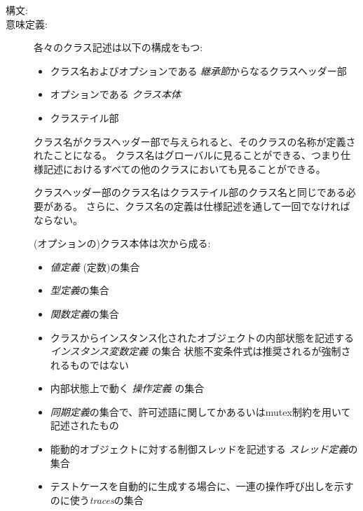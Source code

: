 \documentclass[\pformat,12pt]{jarticle}
\begin{document}
\begin{description}
\item[構文:] 

\item[意味定義:] 各々のクラス記述は以下の構成をもつ:
\begin{itemize}
\item クラス名およびオプションである {\em 継承節}からなるクラスヘッダー部
\item オプションである {\em クラス本体}
\item クラステイル部
\end{itemize}

クラス名がクラスヘッダー部で与えられると、そのクラスの名称が定義されたことになる。 
クラス名はグローバルに見ることができる、つまり仕様記述におけるすべての他のクラスにおいても見ることができる。

クラスヘッダー部のクラス名はクラステイル部のクラス名と同じである必要がある。
 さらに、クラス名の定義は仕様記述を通して一回でなければならない。

 (オプションの)クラス本体は次から成る:
\begin{itemize}
\item  {\it 値定義} (定数)の集合
\item {\it 型定義}の集合
\item {\it 関数定義}の集合
\item クラスからインスタンス化されたオブジェクトの内部状態を記述する{\it インスタンス変数定義} の集合
状態不変条件式は推奨されるが強制されるものではない
\item 内部状態上で動く {\it 操作定義} の集合
\item  {\it 同期定義}の集合で、許可述語に関してかあるいはmutex制約を用いて記述されたもの
\item 能動的オブジェクトに対する制御スレッドを記述する {\it スレッド定義}の集合
\item テストケースを自動的に生成する場合に、一連の操作呼び出しを示すのに使う{\it traces}の集合
\end{itemize}


\end{description}
\end{document}
